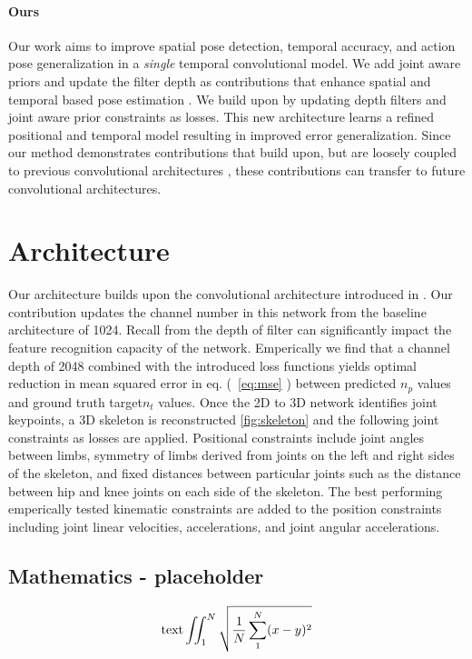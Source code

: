 \documentclass[runningheads]{llncs}
\begin{document}
\paragraph{Ours}Our work aims to improve spatial pose detection, temporal accuracy, and action pose generalization in a \textit{single} temporal convolutional model.  We add joint aware priors and update the filter depth \cite{krizhevsky2012imagenet} as contributions that enhance spatial \cite{chen2018cascaded} and temporal based pose estimation \cite{pavllo20193d}.  We build upon \cite{pavllo20193d} by updating depth filters and joint aware prior constraints as losses. This new architecture learns a refined positional and temporal model resulting in improved error generalization.  Since our method demonstrates contributions that build upon, but are loosely coupled to previous convolutional architectures \cite{pavllo20193d}, these contributions can transfer to future convolutional architectures.

\section{Architecture}

Our architecture builds upon the convolutional architecture introduced in \cite{pavllo20193d}. Our contribution updates the channel number in this network from the baseline architecture of 1024. Recall from \cite{krizhevsky2012imagenet} the depth of filter can significantly impact the feature recognition capacity of the network. Emperically we find that a channel depth of 2048 combined with the introduced loss functions yields optimal reduction in mean squared error in eq. (~\ref{eq:mse} ) between predicted $n_p$ values and ground truth target$n_t$ values. Once the 2D to 3D network identifies joint keypoints, a 3D skeleton is reconstructed \ref{fig:skeleton} and the following joint constraints as losses are applied. Positional constraints include joint angles between limbs, symmetry of limbs derived from joints on the left and right sides of the skeleton, and fixed distances between particular joints such as the distance between hip and knee joints on each side of the skeleton. The best performing emperically tested kinematic constraints are added to the position constraints including joint linear velocities, accelerations, and joint angular accelerations. 

\iffalse
\subsection{Mathematics - placeholder}
$$
\text {text}
\iint_1^N \sqrt{\frac{1}{N}\sum_1^N(x-y)^2 }\\
$$
\end{document}
